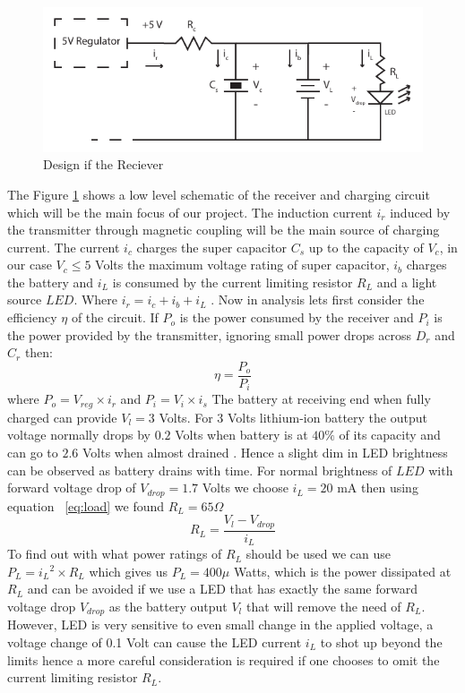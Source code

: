 


\begin{figure}[h!]
\centering
\includegraphics[width=1\textwidth]{rec_design.pdf}
\caption{Design if the Reciever}
\label{fig:rec_des}
\end{figure}


The Figure \ref{fig:rec_des} shows a low level schematic of the receiver and charging circuit which will be the main focus of our project. The induction current $i_r$ induced by the transmitter through magnetic coupling will be the main source of charging current. The current $i_c$ charges the super capacitor $C_s$ up to the capacity of $V_c$, in our case $V_c \leq 5$ Volts the maximum voltage rating of super capacitor, $i_b$ charges the battery and $i_L$ is consumed by the current limiting resistor $R_L$  and a light source $LED$. Where $i_r = i_c + i_b +i_L$ . Now in analysis lets first consider the efficiency ${\eta}$ of the circuit.
If $P_{o}$ is the power consumed by the receiver and $P_{i}$ is the power provided by the transmitter, ignoring small power drops across $D_r$ and $C_r$  then:
\begin{equation}\label{eq:effb}
 {\eta} = \frac{P_o}{P_i}
\end{equation}
where $P_o = V_{reg} \times i_r $ and $P_i = V_i \times i_s $
The battery at receiving end when fully charged can provide $V_l = 3 $ Volts.
For 3 Volts lithium-ion battery the output voltage normally drops by $0.2 $ Volts when battery is at $40 \%$ of its capacity and can go to $2.6 $ Volts when almost drained \cite{IAmp}. Hence a slight dim in LED brightness can be observed as battery drains with time.
For normal brightness of $LED$ with forward voltage drop of $V_{drop} = 1.7 $ Volts we choose $i_L = 20 $ mA then using equation ~\ref{eq:load} we found $R_L = 65 \Omega $
\begin{equation}\label{eq:load}
 R_L = \frac{V_l - V_{drop}}{i_L}
\end{equation}
To find out with what power ratings of $R_L$ should be used we can use $P_L = {i_L}^2 \times R_L $ which gives us $P_L = 400 \mu$ Watts, which is the power dissipated at $R_L$ and can be avoided if we use a LED that has exactly the same forward voltage drop $V_{drop}$ as the battery output $V_l$ that will remove the need of $R_L$. However, LED is very sensitive to even small change in the applied voltage, a voltage change of 0.1 Volt can cause the LED current $i_L$ to shot up beyond the limits hence a more careful consideration is required if one chooses to omit the current limiting resistor $R_L$.
